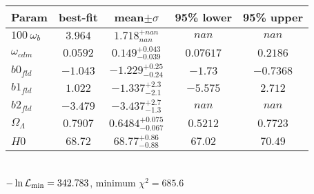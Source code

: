\begin{tabular}{|l|c|c|c|c|} 
 \hline 
Param & best-fit & mean$\pm\sigma$ & 95\% lower & 95\% upper \\ \hline 
$100~\omega_{b }$ &$3.964$ & $1.718_{nan}^{+nan}$ & $nan$ & $nan$ \\ 
$\omega_{cdm }$ &$0.0592$ & $0.149_{-0.039}^{+0.043}$ & $0.07617$ & $0.2186$ \\ 
$b0_{fld }$ &$-1.043$ & $-1.229_{-0.24}^{+0.25}$ & $-1.73$ & $-0.7368$ \\ 
$b1_{fld }$ &$1.022$ & $-1.337_{-2.1}^{+2.3}$ & $-5.575$ & $2.712$ \\ 
$b2_{fld }$ &$-3.479$ & $-3.437_{-1.3}^{+2.7}$ & $nan$ & $nan$ \\ 
$\Omega_{\Lambda }$ &$0.7907$ & $0.6484_{-0.067}^{+0.075}$ & $0.5212$ & $0.7723$ \\ 
$H0$ &$68.72$ & $68.77_{-0.88}^{+0.86}$ & $67.02$ & $70.49$ \\ 
\hline 
 \end{tabular} \\ 
$-\ln{\cal L}_\mathrm{min} =342.783$, minimum $\chi^2=685.6$ \\ 
